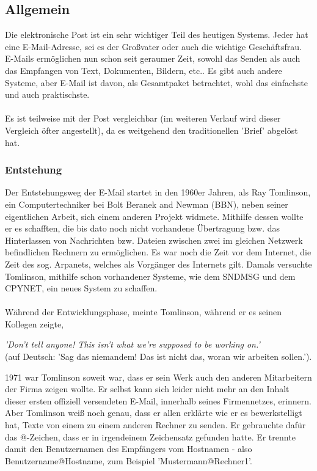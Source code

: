 \documentclass[12pt,a4paper]{report}
\begin{document}
\begin{onehalfspace}
\section{Allgemein}
Die elektronische Post ist ein sehr wichtiger Teil des heutigen Systems. Jeder hat eine E-Mail-Adresse, sei es der Großvater oder auch die wichtige Geschäftsfrau. E-Mails ermöglichen nun schon seit geraumer Zeit, sowohl das Senden als auch das Empfangen von Text, Dokumenten, Bildern, etc.. Es gibt auch andere Systeme, aber E-Mail ist davon, als Gesamtpaket betrachtet, wohl das einfachste und auch praktischste.\\\\
Es ist teilweise mit der Post vergleichbar (im weiteren Verlauf wird dieser Vergleich öfter angestellt), da es weitgehend den traditionellen 'Brief' abgelöst hat.  
\subsubsection{Entstehung}\label{sssec:Entstehung}
Der Entstehungsweg der E-Mail startet in den 1960er Jahren, als Ray Tomlinson, ein Computertechniker bei Bolt Beranek and Newman (BBN), neben seiner eigentlichen Arbeit, sich einem anderen Projekt widmete. Mithilfe dessen wollte er es schafften, die bis dato noch nicht vorhandene Übertragung bzw. das Hinterlassen von Nachrichten bzw. Dateien zwischen zwei im gleichen Netzwerk befindlichen Rechnern zu ermöglichen. Es war noch die Zeit vor dem Internet, die Zeit des sog. Arpanets, welches als Vorgänger des Internets gilt. Damals versuchte Tomlinson, mithilfe schon vorhandener Systeme, wie dem SNDMSG und dem CPYNET, ein neues System zu schaffen.\\\\

Während der Entwicklungsphase, meinte Tomlinson, während er es seinen Kollegen zeigte, 
\begin{center}
\textit{'Don't tell anyone! This isn't what we're supposed to be working on.'}\\
(auf Deutsch: 'Sag das niemandem! Das ist nicht das, woran wir arbeiten sollen.').
\end{center}
1971 war Tomlinson soweit war, dass er sein Werk auch den anderen Mitarbeitern der Firma zeigen wollte. Er selbst kann sich leider nicht mehr an den Inhalt dieser ersten offiziell versendeten E-Mail, innerhalb seines Firmennetzes, erinnern. Aber Tomlinson weiß noch genau, dass er allen erklärte wie er es bewerkstelligt hat, Texte von einem zu einem anderen Rechner zu senden. Er gebrauchte dafür das @-Zeichen, dass er in irgendeinem Zeichensatz gefunden hatte. Er trennte damit den Benutzernamen des Empfängers vom Hostnamen - also Benutzername@Hostname, zum Beispiel 'Mustermann@Rechner1'. \\


\end{onehalfspace}
\end{document}
